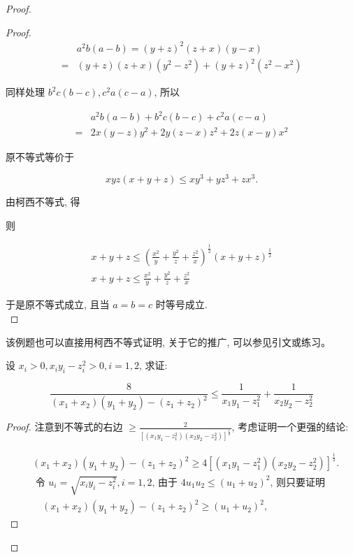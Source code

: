 \begin{proof}
\begin{proof}
	$$
	\begin{aligned}
	& a^{2} b(a-b)=(y+z)^{2}(z+x)(y-x) \\
	= & (y+z)(z+x)\left(y^{2}-z^{2}\right)+(y+z)^{2}\left(z^{2}-x^{2}\right)
	\end{aligned}
	$$
	
	同样处理 $b^{2} c(b-c), c^{2} a(c-a)$, 所以
	
	$$
	\begin{aligned}
	& a^{2} b(a-b)+b^{2} c(b-c)+c^{2} a(c-a) \\
	= & 2 x(y-z) y^{2}+2 y(z-x) z^{2}+2 z(x-y) x^{2}
	\end{aligned}
	$$
	
	原不等式等价于
	
	$$
	x y z(x+y+z) \leqslant x y^{3}+y z^{3}+z x^{3} .
	$$
	
	由柯西不等式, 得
	
	则
	
	$$
	\begin{gathered}
	x+y+z \leqslant\left(\frac{x^{2}}{y}+\frac{y^{2}}{z}+\frac{z^{2}}{x}\right)^{\frac{1}{2}}(x+y+z)^{\frac{1}{2}} \\
	x+y+z \leqslant \frac{x^{2}}{y}+\frac{y^{2}}{z}+\frac{z^{2}}{x}
	\end{gathered}
	$$
	
	于是原不等式成立, 且当 $a=b=c$ 时等号成立.\\
\end{proof}
\begin{note}
	该例题也可以直接用柯西不等式证明, 关于它的推广, 可以参见引文或练习。
\end{note}

\begin{example}
	设 $x_{i}>0, x_{i} y_{i}-z_{i}^{2}>0, i=1,2$, 求证:
	
	$$
	\frac{8}{\left(x_{1}+x_{2}\right)\left(y_{1}+y_{2}\right)-\left(z_{1}+z_{2}\right)^{2}} \leqslant \frac{1}{x_{1} y_{1}-z_{1}^{2}}+\frac{1}{x_{2} y_{2}-z_{2}^{2}}
	$$
\end{example}
\begin{proof}
	注意到不等式的右边 $\geqslant \frac{2}{\left[\left(x_{1} y_{1}-z_{1}^{2}\right)\left(x_{2} y_{2}-z_{2}^{2}\right)\right]^{\frac{1}{2}}}$, 考虑证明一个更强的结论:
	
	$$
	\begin{aligned}
	& \left(x_{1}+x_{2}\right)\left(y_{1}+y_{2}\right)-\left(z_{1}+z_{2}\right)^{2} \geqslant 4\left[\left(x_{1} y_{1}-z_{1}^{2}\right)\left(x_{2} y_{2}-z_{2}^{2}\right)\right]^{\frac{1}{2}} . \\
	& \text { 令 } u_{i}=\sqrt{x_{i} y_{i}-z_{i}^{2}}, i=1,2 \text {, 由于 } 4 u_{1} u_{2} \leqslant\left(u_{1}+u_{2}\right)^{2} \text {, 则只要证明 } \\
	& \quad\left(x_{1}+x_{2}\right)\left(y_{1}+y_{2}\right)-\left(z_{1}+z_{2}\right)^{2} \geqslant\left(u_{1}+u_{2}\right)^{2},
	\end{aligned}
	$$
	

\end{proof}
\end{proof}

